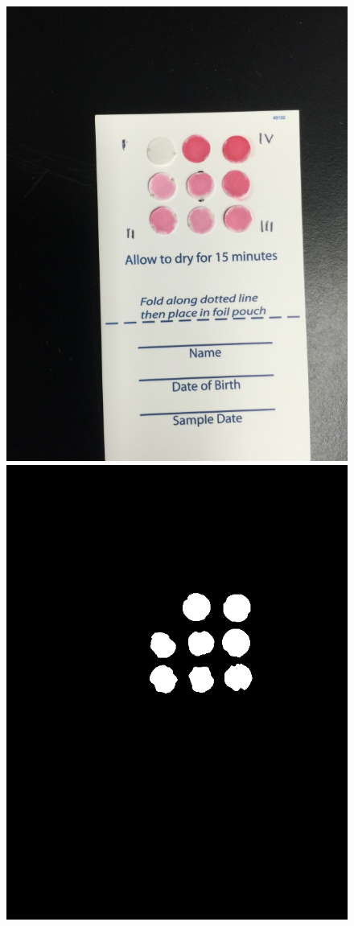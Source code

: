 \documentclass[runningheads,a4paper]{llncs}
\begin{document}
\begin{figure}[h]
\begin{center}
\includegraphics[scale=0.18]{in}
\includegraphics[scale=0.18]{out_2}

\end{center}
\end{figure}
\end{document}
